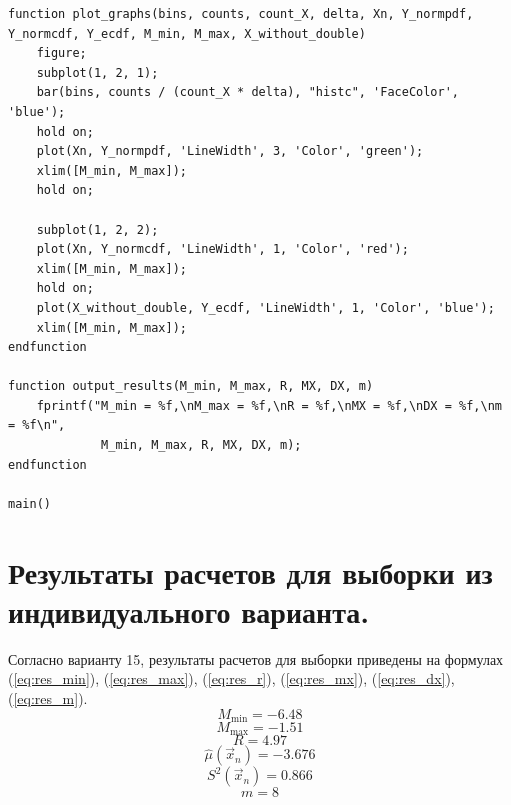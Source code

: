 \begin{lstlisting}[label=lst:code, caption=Модуль разработанных алгоритмов, basicstyle=\footnotesize]
function plot_graphs(bins, counts, count_X, delta, Xn, Y_normpdf, Y_normcdf, Y_ecdf, M_min, M_max, X_without_double)
	figure;
	subplot(1, 2, 1);
	bar(bins, counts / (count_X * delta), "histc", 'FaceColor', 'blue');
	hold on;
	plot(Xn, Y_normpdf, 'LineWidth', 3, 'Color', 'green');
	xlim([M_min, M_max]);
	hold on;
	
	subplot(1, 2, 2);
	plot(Xn, Y_normcdf, 'LineWidth', 1, 'Color', 'red');
	xlim([M_min, M_max]);
	hold on;
	plot(X_without_double, Y_ecdf, 'LineWidth', 1, 'Color', 'blue');
	xlim([M_min, M_max]);
endfunction

function output_results(M_min, M_max, R, MX, DX, m)
	fprintf("M_min = %f,\nM_max = %f,\nR = %f,\nMX = %f,\nDX = %f,\nm = %f\n",
			 M_min, M_max, R, MX, DX, m);
endfunction

main()
\end{lstlisting}

\newpage
\section{Результаты расчетов для выборки из индивидуального варианта.}
Согласно варианту 15, результаты расчетов для выборки приведены на формулах (\ref{eq:res_min}), (\ref{eq:res_max}), (\ref{eq:res_r}), (\ref{eq:res_mx}), (\ref{eq:res_dx}), (\ref{eq:res_m}).
\begin{equation}
	\label{eq:res_min}
	M_{\min} = -6.48
\end{equation}
\begin{equation}
	\label{eq:res_max}
	M_{\max} = -1.51
\end{equation}
\begin{equation}
	\label{eq:res_r}
	R = 4.97
\end{equation}
\begin{equation}
	\label{eq:res_mx}
	\hat\mu(\vec x_n) = -3.676
\end{equation}
\begin{equation}
	\label{eq:res_dx}
	S^2(\vec x_n) = 0.866
\end{equation}
\begin{equation}
	\label{eq:res_m}
	m = 8
\end{equation}

